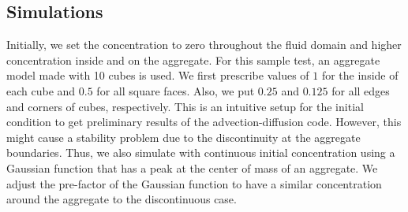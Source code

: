 \subsection{Simulations}
Initially, we set the concentration to zero throughout the fluid domain and higher concentration inside and on the aggregate. For this sample test, an aggregate model made with 10 cubes is used. We first prescribe values of $1$ for the inside of each cube and $0.5$ for all square faces. Also, we put $0.25$ and $0.125$ for all edges and corners of cubes, respectively. This is an intuitive setup for the initial condition to get preliminary results of the advection-diffusion code. However, this might cause a stability problem due to the discontinuity at the aggregate boundaries. Thus, we also simulate with continuous initial concentration using a Gaussian function that has a peak at the center of mass of an aggregate. We adjust the pre-factor of the Gaussian function to have a similar concentration around the aggregate to the discontinuous case. 


